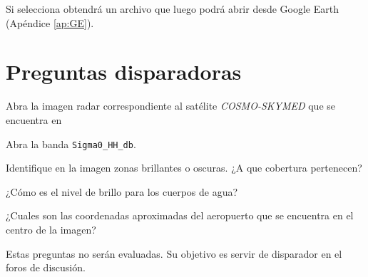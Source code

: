 Si selecciona  obtendrá un archivo  que luego podrá abrir desde Google Earth (Apéndice \ref{ap:GE}).

\section{Preguntas disparadoras}

Abra la imagen radar correspondiente al satélite \emph{COSMO-SKYMED} que se encuentra en
\begin{center}
\end{center}
Abra la banda \texttt{Sigma0\_HH\_db}.

\begin{que}
    Identifique en la imagen zonas brillantes o oscuras. ¿A que cobertura pertenecen?
\end{que}

\begin{que}
    ¿Cómo es el nivel de brillo para los cuerpos de agua?
\end{que}

\begin{que}
    ¿Cuales son las coordenadas aproximadas del aeropuerto que se encuentra en el centro de la imagen?
\end{que}

Estas preguntas no serán evaluadas. Su objetivo es servir de disparador en el foros de discusión.
